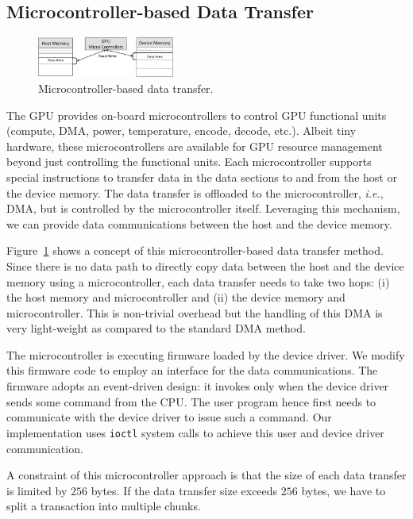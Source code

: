 \subsection{Microcontroller-based Data Transfer}
\label{sec:micro}

\begin{figure}[!t]
 \centering
 \includegraphics[width=0.4\textwidth]{figure/Method/Micro_Method.pdf}
 \caption{Microcontroller-based data transfer.}
 \label{fig:micro}
\end{figure}

The GPU provides on-board microcontrollers to control GPU functional
units (compute, DMA, power, temperature, encode, decode, etc.).
Albeit tiny hardware, these microcontrollers are available for GPU
resource management beyond just controlling the functional units.
Each microcontroller supports special instructions to transfer data in
the data sections to and from the host or the device memory.
The data transfer is offloaded to the microcontroller, \textit{i.e.},
DMA, but is controlled by the microcontroller itself.
Leveraging this mechanism, we can provide data communications between
the host and the device memory.

Figure~\ref{fig:micro} shows a concept of this microcontroller-based
data transfer method.
Since there is no data path to directly copy data between the host and
the device memory using a microcontroller, each data transfer needs
to take two hops: (i) the host memory and microcontroller and (ii) the
device memory and microcontroller.
This is non-trivial overhead but the handling of this DMA is very
light-weight as compared to the standard DMA method.

The microcontroller is executing firmware loaded by the device driver.
We modify this firmware code to employ an interface for the data
communications.
The firmware adopts an event-driven design: it invokes only when the
device driver sends some command from the CPU.
The user program hence first needs to communicate with the device driver
to issue such a command.
Our implementation uses \texttt{ioctl} system calls to achieve this user
and device driver communication.

A constraint of this microcontroller approach is that the size of each
data transfer is limited by $256$ bytes.
If the data transfer size exceeds $256$ bytes, we have to split a
transaction into multiple chunks.

